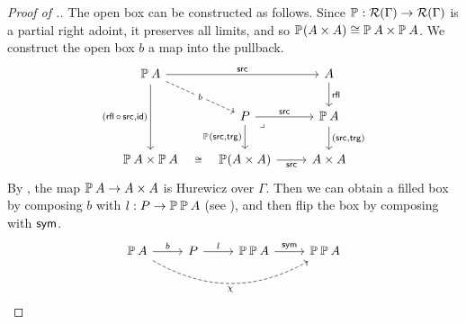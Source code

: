 \begin{proof}[Proof of .]
  The open box can be constructed as follows.
  Since $\mathop{\mathbb{P}_{}} : \mathcal{R}(\Gamma) \to \mathcal{R}(\Gamma)$ is a partial right adoint,
  it preserves all limits,
  and so $\mathop{\mathbb{P}_{}} (A \times A) \cong \mathop{\mathbb{P}_{}} A \times \mathop{\mathbb{P}_{}} A$.
  We construct the open box $b$
  a map into the pullback.
  \[ \begin{tikzcd}
        {\arr A} && A \\
        & P & {\arr A} \\
        {\arr A \times \arr A} & {\arr (A \times A)} & {A \times A}
        \arrow["\src", from=1-1, to=1-3]
        \arrow["b"{description}, dashed, from=1-1, to=2-2]
        \arrow["{(\rfl \circ \src, \id)}"', from=1-1, to=3-1]
        \arrow["\rfl", from=1-3, to=2-3]
        \arrow["\src", from=2-2, to=2-3]
        \arrow["{\arr (\src,\trg)}"', from=2-2, to=3-2]
        \arrow["{(\src,\trg)}", from=2-3, to=3-3]
        \arrow["\iso"{description}, draw=none, from=3-2, to=3-1]
        \arrow["\src"', from=3-2, to=3-3]
        \arrow["\lrcorner"{anchor=center, pos=0.125}, draw=none, from=2-2, to=3-3]
    \end{tikzcd} \]
  By ,
  the map $\mathop{\mathbb{P}_{}} A \to A \times A$ is Hurewicz over $\Gamma$.
  Then we can obtain a filled box by composing $b$ with $l : P \to \mathop{\mathbb{P}_{}} \mathop{\mathbb{P}_{}} A$
  (see ),
  and then flip the box by composing with $\mathop{\mathsf{sym}}$.
  \[ 
    \begin{tikzcd}
        {\arr A} & P & {\arr \arr A} & {\arr \arr A}
        \arrow["b", from=1-1, to=1-2]
        \arrow["\chi"', bend right, dashed, from=1-1, to=1-4]
        \arrow["l", from=1-2, to=1-3]
        \arrow["\sym", from=1-3, to=1-4]
    \end{tikzcd}
  \]
\end{proof}

